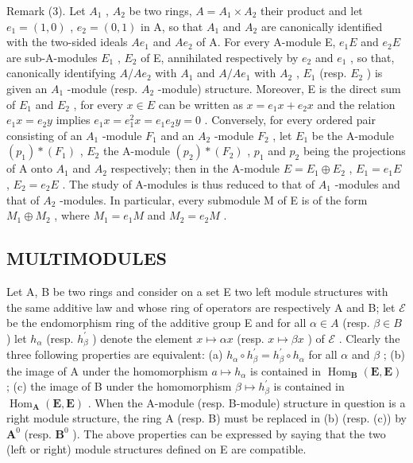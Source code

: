 Remark (3). Let \(A_{1}\) , \(A_{2}\) be two rings, \(A = A_{1} \times A_{2}\) their product and let \(e_{1} = (1, 0)\) , \(e_{2} = (0, 1)\) in A, so that \(A_{1}\) and \(A_{2}\) are canonically identified with the two-sided ideals \(Ae_{1}\) and \(Ae_{2}\) of A. For every A-module E, \(e_{1}E\) and \(e_{2}E\) are sub-A-modules \(E_{1}\) , \(E_{2}\) of E, annihilated respectively by \(e_{2}\) and \(e_{1}\) , so that, canonically identifying \(A/Ae_{2}\) with \(A_{1}\) and \(A/Ae_{1}\) with \(A_{2}\) , \(E_{1}\) (resp. \(E_{2}\) ) is given an \(A_{1}\) -module (resp. \(A_{2}\) -module) structure. Moreover, E is the direct sum of \(E_{1}\) and \(E_{2}\) , for every \(x \in E\) can be written as \(x = e_{1}x + e_{2}x\) and the relation \(e_{1}x = e_{2}y\) implies \(e_{1}x = e_{1}^{2}x = e_{1}e_{2}y = 0\) . Conversely, for every ordered pair consisting of an \(A_{1}\) -module \(F_{1}\) and an \(A_{2}\) -module \(F_{2}\) , let \(E_{1}\) be the A-module \((p_{1}) * (F_{1})\) , \(E_{2}\) the A-module \((p_{2}) * (F_{2})\) , \(p_{1}\) and \(p_{2}\) being the projections of A onto \(A_{1}\) and \(A_{2}\) respectively; then in the A-module \(E = E_{1} \oplus E_{2}\) , \(E_{1} = e_{1}E\) , \(E_{2} = e_{2}E\) . The study of A-modules is thus reduced to that of \(A_{1}\) -modules and that of \(A_{2}\) -modules. In particular, every submodule M of E is of the form \(M_{1} \oplus M_{2}\) , where \(M_{1} = e_{1}M\) and \(M_{2} = e_{2}M\) .

\subsection{MULTIMODULES}

Let A, B be two rings and consider on a set E two left module structures with the same additive law and whose ring of operators are respectively A and B; let \(\mathcal{E}\) be the endomorphism ring of the additive group E and for all \(\alpha \in A\) (resp. \(\beta \in B\) ) let \(h_{\alpha}\) (resp. \(h_{\beta}^{\prime}\) ) denote the element \(x \mapsto \alpha x\) (resp. \(x \mapsto \beta x\) ) of \(\mathcal{E}\) . Clearly the three following properties are equivalent: (a) \(h_{\alpha} \circ h_{\beta}^{\prime} = h_{\beta}^{\prime} \circ h_{\alpha}\) for all \(\alpha\) and \(\beta\) ; (b) the image of A under the homomorphism \(a \mapsto h_{\alpha}\) is contained in \(\operatorname{Hom}_{\mathbf{B}}(\mathbf{E}, \mathbf{E})\) ; (c) the image of B under the homomorphism \(\beta \mapsto h_{\beta}^{\prime}\) is contained in \(\operatorname{Hom}_{\mathbf{A}}(\mathbf{E}, \mathbf{E})\) . When the A-module (resp. B-module) structure in question is a right module structure, the ring A (resp. B) must be replaced in (b) (resp. (c)) by \(\mathbf{A}^{0}\) (resp. \(\mathbf{B}^{0}\) ). The above properties can be expressed by saying that the two (left or right) module structures defined on E are compatible.


